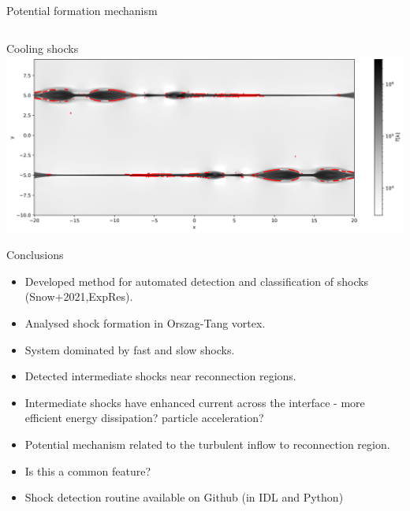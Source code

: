 \documentclass[10pt,aspectratio=169,usenames,dvipsnames]{beamer}
\begin{document}
\begin{frame}{Potential formation mechanism}
\begin{columns}
\begin{column}{0.5\textwidth}
\end{column}
\end{columns}
\end{frame}

\begin{frame}{Cooling shocks}
\includegraphics[width=0.95\linewidth]{2023AAPPS-DPP/Figures/shockCoolingTest_context.png}    
\end{frame}

\begin{frame}{Conclusions}
\begin{itemize}
    \item Developed method for automated detection and classification of shocks (Snow+2021,ExpRes).
    \item Analysed shock formation in Orszag-Tang vortex.
    \item System dominated by fast and slow shocks.
    \item Detected intermediate shocks near reconnection regions.
    \item Intermediate shocks have enhanced current across the interface - more efficient energy dissipation? particle acceleration?
    \item Potential mechanism related to the turbulent inflow to reconnection region.
    \item Is this a common feature?
    \item Shock detection routine available on Github (in IDL and Python)
\end{itemize}
\end{frame}
\end{document}
